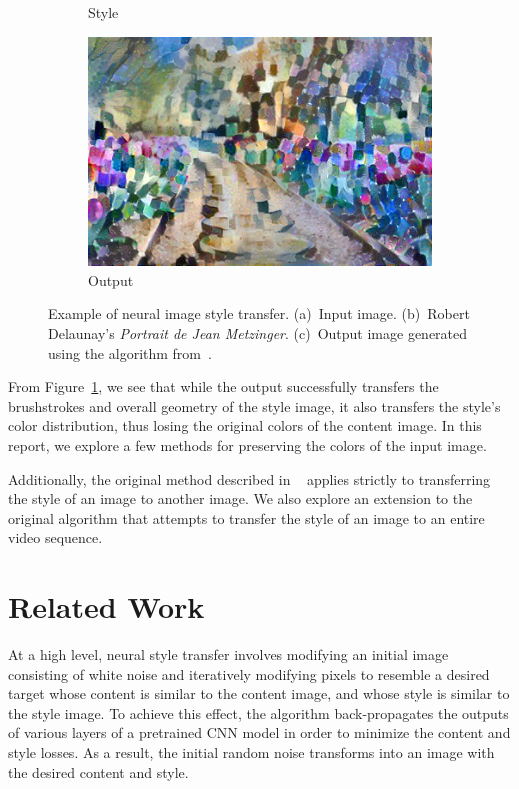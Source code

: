 \documentclass[10pt,twocolumn,letterpaper]{article}
\begin{document}
\begin{figure}[ht]
\begin{subfigure}[b]{0.19\linewidth}
  \caption{Style}
\end{subfigure}
\quad
\begin{subfigure}[b]{0.38\linewidth}
  \centering
  \includegraphics[width=\linewidth]{imgs/flowers-delaunay.jpg}
  \caption{Output}
\end{subfigure}
\caption{Example of neural image style transfer. (a)~Input image. (b)~Robert Delaunay's \textit{Portrait de Jean Metzinger}. (c)~Output image generated using the algorithm from~\cite{gatys-orig}.}
\label{fig:orig}
\end{figure}

From Figure~\ref{fig:orig}, we see that while the output successfully transfers the brushstrokes and overall geometry of the style image, it also transfers the style's color distribution, thus losing the original colors of the content image. In this report, we explore a few methods for preserving the colors of the input image.

Additionally, the original method described in ~\cite{gatys-orig} applies strictly to transferring the style of an image to another image. We also explore an extension to the original algorithm that attempts to transfer the style of an image to an entire video sequence.

\section{Related Work}
At a high level, neural style transfer involves modifying an initial image consisting of white noise and iteratively modifying pixels to resemble a desired target whose content is similar to the content image, and whose style is similar to the style image. To achieve this effect, the algorithm back-propagates the outputs of various layers of a pretrained CNN model in order to minimize the content and style losses. As a result, the initial random noise transforms into an image with the desired content and style.
\end{document}
